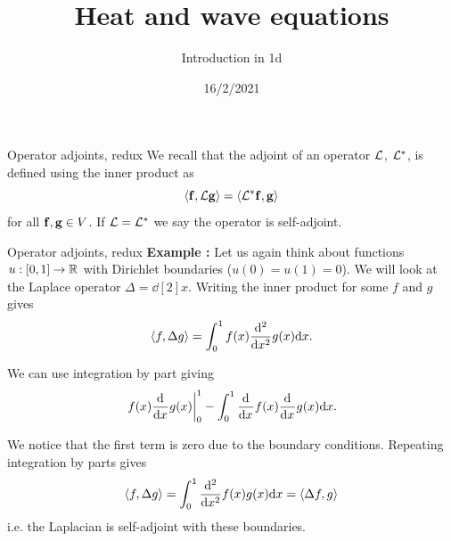 

\title{Heat and wave equations}
\subtitle{Introduction in 1d}
\date{16/2/2021}
\date{}


	
	\maketitle
	



\begin{frame}{Operator adjoints, redux}
	We recall that the adjoint of an operator $ \opone $, $ \opone^{*} $, is defined using the inner product as 
	\[ \iprod{\fone}{\opone \ftwo}  = \iprod{\opone^{*}\fone}{\ftwo}\]
	for all $ \fone, \ftwo \in V $. If $ \opone = \opone^{*} $ we say the operator is self-adjoint. 
\end{frame}

\begin{frame}{Operator adjoints, redux}
	\textbf{Example \examplen:} Let us again think about functions $ u: [0,1] \to \R $ with Dirichlet boundaries ($ u(0)=u(1)=0 $). We will look at the Laplace operator $ \Delta =\dd[2]{}{x}$. Writing the inner product for some $ f $ and $ g $ gives
	\[ \iprod{f}{\Delta g} = \int_{0}^{1} f(x) \dd[2]{}{x} g(x) \diff x. \]
	
	\pause
	We can use integration by part giving 
	\[ \left. f(x) \dd{}{x} g(x) \right|_{0}^{1} -  \int_{0}^{1} \dd{}{x} f(x) \dd{}{x} g(x) \diff x. \]
	
	\pause
	We notice that the first term is zero due to the boundary conditions. Repeating integration by parts gives
	\[ \iprod{f}{\Delta g} = \int_{0}^{1} \dd[2]{}{x} f(x)  g(x) \diff x = \iprod{\Delta f}{g} \]
	i.e. the Laplacian is self-adjoint with these boundaries.
\end{frame}

